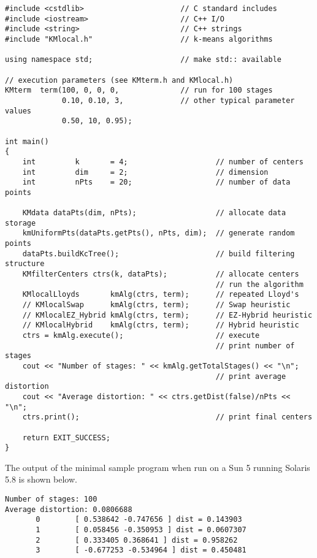 \documentclass[11pt]{article}		%
\begin{document}
{\small\begin{verbatim}
#include <cstdlib>                      // C standard includes
#include <iostream>                     // C++ I/O
#include <string>                       // C++ strings
#include "KMlocal.h"                    // k-means algorithms

using namespace std;                    // make std:: available

// execution parameters (see KMterm.h and KMlocal.h)
KMterm  term(100, 0, 0, 0,              // run for 100 stages
             0.10, 0.10, 3,             // other typical parameter values 
             0.50, 10, 0.95);

int main()
{
    int         k       = 4;                    // number of centers
    int         dim     = 2;                    // dimension
    int         nPts    = 20;                   // number of data points

    KMdata dataPts(dim, nPts);                  // allocate data storage
    kmUniformPts(dataPts.getPts(), nPts, dim);  // generate random points
    dataPts.buildKcTree();                      // build filtering structure
    KMfilterCenters ctrs(k, dataPts);           // allocate centers
                                                // run the algorithm
    KMlocalLloyds       kmAlg(ctrs, term);      // repeated Lloyd's
    // KMlocalSwap      kmAlg(ctrs, term);      // Swap heuristic
    // KMlocalEZ_Hybrid kmAlg(ctrs, term);      // EZ-Hybrid heuristic
    // KMlocalHybrid    kmAlg(ctrs, term);      // Hybrid heuristic
    ctrs = kmAlg.execute();                     // execute
                                                // print number of stages
    cout << "Number of stages: " << kmAlg.getTotalStages() << "\n";
                                                // print average distortion
    cout << "Average distortion: " << ctrs.getDist(false)/nPts << "\n";
    ctrs.print();                               // print final centers

    return EXIT_SUCCESS;
}
\end{verbatim}}

The output of the minimal sample program when run on a Sun 5 running
Solaris 5.8 is shown below.
{\small\begin{verbatim}
Number of stages: 100
Average distortion: 0.0806688
       0        [ 0.538642 -0.747656 ] dist = 0.143903
       1        [ 0.058456 -0.350953 ] dist = 0.0607307
       2        [ 0.333405 0.368641 ] dist = 0.958262
       3        [ -0.677253 -0.534964 ] dist = 0.450481
\end{verbatim}}
\end{document}
